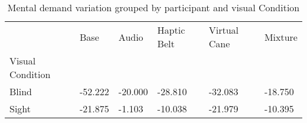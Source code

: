 
\begin{table}[!htb]
\centering
\caption{Mental demand variation grouped by participant and visual Condition}
\label{tab:md_var_average_group}
\begin{tabular}{llllll}
\toprule
{} &    Base &   Audio &  Haptic Belt &  Virtual Cane &  Mixture \\
Visual Condition &         &         &              &               &          \\
\midrule
Blind            & -52.222 & -20.000 &      -28.810 &       -32.083 &  -18.750 \\
Sight            & -21.875 &  -1.103 &      -10.038 &       -21.979 &  -10.395 \\
\bottomrule
\end{tabular}
\end{table}

